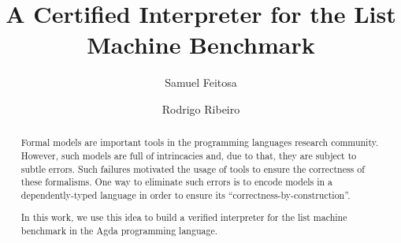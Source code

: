 \documentclass[sigconf]{acmart}
\theoremstyle{definition}
\begin{document}



\title{A Certified Interpreter for the List Machine Benchmark}

\author{Samuel Feitosa}
\authornotemark[1]

\author{Rodrigo Ribeiro}





\begin{abstract}
Formal models are important tools in the programming languages research
community. However, such models are full of intrincacies and, due to that,
they are subject to subtle errors. Such failures motivated the usage of
tools to ensure the correctness of these formalisms. One way to eliminate
such errors is to encode models in a dependently-typed language in order
to ensure its ``correctness-by-construction''.

In this work, we use this idea to build a verified interpreter
for the list machine benchmark in the Agda programming language.
\end{abstract}


\end{document}
